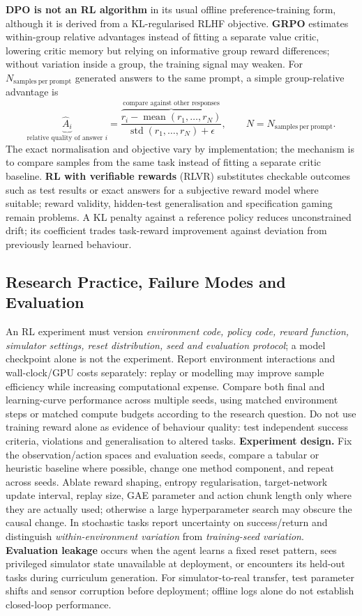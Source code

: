 \textbf{DPO is not an RL algorithm} in its usual offline preference-training form, although it is derived from a KL-regularised RLHF objective.
\textbf{GRPO} estimates within-group relative advantages instead of fitting a separate value critic, lowering critic memory but relying on informative group reward differences; without variation inside a group, the training signal may weaken.
For $N_{\mathrm{samples\ per\ prompt}}$ generated answers to the same prompt, a simple group-relative advantage is
\[
\underbrace{\widehat A_i}_{\text{relative quality of answer }i}
=\frac{\overbrace{r_i-\operatorname{mean}(r_1,\dots,r_N)}^{\text{compare against other responses}}}{\operatorname{std}(r_1,\dots,r_N)+\epsilon},\qquad N=N_{\mathrm{samples\ per\ prompt}}.
\]
The exact normalisation and objective vary by implementation; the mechanism is to compare samples from the same task instead of fitting a separate critic baseline.
\textbf{RL with verifiable rewards} (RLVR) substitutes checkable outcomes such as test results or exact answers for a subjective reward model where suitable; reward validity, hidden-test generalisation and specification gaming remain problems.
A KL penalty against a reference policy reduces unconstrained drift; its coefficient trades task-reward improvement against deviation from previously learned behaviour.

\subsection{Research Practice, Failure Modes and Evaluation}\label{sec:rl-research-practice}
An RL experiment must version \emph{environment code, policy code, reward function, simulator settings, reset distribution, seed and evaluation protocol}; a model checkpoint alone is not the experiment.
Report environment interactions and wall-clock/GPU costs separately: replay or modelling may improve sample efficiency while increasing computational expense.
Compare both final and learning-curve performance across multiple seeds, using matched environment steps or matched compute budgets according to the research question.
Do not use training reward alone as evidence of behaviour quality: test independent success criteria, violations and generalisation to altered tasks.
\textbf{Experiment design.} Fix the observation/action spaces and evaluation seeds, compare a tabular or heuristic baseline where possible, change one method component, and repeat across seeds.
Ablate reward shaping, entropy regularisation, target-network update interval, replay size, GAE parameter and action chunk length only where they are actually used; otherwise a large hyperparameter search may obscure the causal change.
In stochastic tasks report uncertainty on success/return and distinguish \emph{within-environment variation} from \emph{training-seed variation}.
\textbf{Evaluation leakage} occurs when the agent learns a fixed reset pattern, sees privileged simulator state unavailable at deployment, or encounters its held-out tasks during curriculum generation.
For simulator-to-real transfer, test parameter shifts and sensor corruption before deployment; offline logs alone do not establish closed-loop performance.

